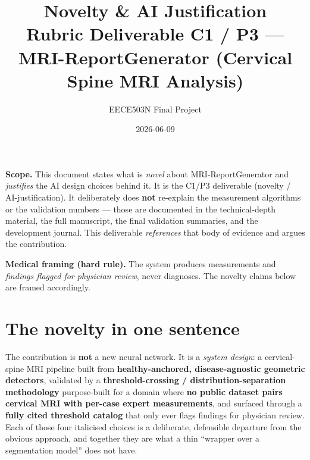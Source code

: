 \documentclass[11pt]{article}
\title{\textbf{Novelty \& AI Justification}\\[2pt]
\large Rubric Deliverable C1 / P3 --- MRI-ReportGenerator (Cervical Spine MRI Analysis)}
\author{EECE503N Final Project}
\date{2026-06-09}
\begin{document}
\maketitle

\noindent\textbf{Scope.} This document states what is \emph{novel} about MRI-ReportGenerator and
\emph{justifies} the AI design choices behind it. It is the C1/P3 deliverable (novelty /
AI-justification). It deliberately does \textbf{not} re-explain the measurement algorithms or the
validation numbers --- those are documented in the technical-depth material, the full manuscript, the
final validation summaries, and the development journal. This deliverable \emph{references} that body of
evidence and argues the contribution.

\medskip
\noindent\textbf{Medical framing (hard rule).} The system produces measurements and \emph{findings
flagged for physician review}, never diagnoses. The novelty claims below are framed accordingly.

\section{The novelty in one sentence}
The contribution is \textbf{not} a new neural network. It is a \emph{system design}: a cervical-spine
MRI pipeline built from \textbf{healthy-anchored, disease-agnostic geometric detectors}, validated by a
\textbf{threshold-crossing / distribution-separation methodology} purpose-built for a domain where
\textbf{no public dataset pairs cervical MRI with per-case expert measurements}, and surfaced through a
\textbf{fully cited threshold catalog} that only ever flags findings for physician review. Each of those
four italicised choices is a deliberate, defensible departure from the obvious approach, and together
they are what a thin ``wrapper over a segmentation model'' does not have.

\end{document}

